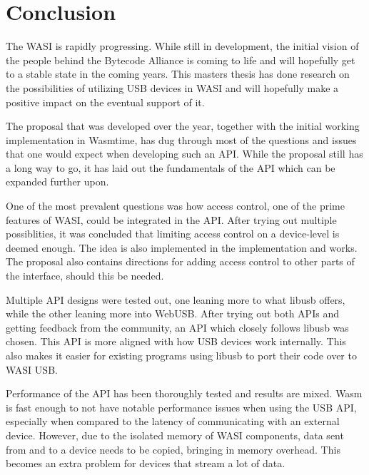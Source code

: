 \chapter{Conclusion}

The \acrfull{WASI} is rapidly progressing. While still in development, the initial vision of the people behind the Bytecode Alliance is coming to life and will hopefully get to a stable state in the coming years. This masters thesis has done research on the possibilities of utilizing \acrshort{USB} devices in \acrshort{WASI} and will hopefully make a positive impact on the eventual support of it. 

The proposal that was developed over the year, together with the initial working implementation in Wasmtime, has dug through most of the questions and issues that one would expect when developing such an \acrshort{API}. While the proposal still has a long way to go, it has laid out the fundamentals of the \acrshort{API} which can be expanded further upon.

One of the most prevalent questions was how access control, one of the prime features of \acrshort{WASI}, could be integrated in the \acrshort{API}. After trying out multiple possiblities, it was concluded that limiting access control on a device-level is deemed enough. The idea is also implemented in the implementation and works. The proposal also contains directions for adding access control to other parts of the interface, should this be needed.

Multiple \acrshort{API} designs were tested out, one leaning more to what libusb offers, while the other leaning more into WebUSB. After trying out both \acrshort{API}s and getting feedback from the community, an \acrshort{API} which closely follows libusb was chosen. This \acrshort{API} is more aligned with how \acrshort{USB} devices work internally. This also makes it easier for existing programs using libusb to port their code over to \acrshort{WASI} \acrshort{USB}.

Performance of the \acrshort{API} has been thoroughly tested and results are mixed. \acrfull{Wasm} is fast enough to not have notable performance issues when using the \acrshort{USB} \acrshort{API}, especially when compared to the latency of communicating with an external device. However, due to the isolated memory of \acrshort{WASI} components, data sent from and to a device needs to be copied, bringing in memory overhead. This becomes an extra problem for devices that stream a lot of data.

